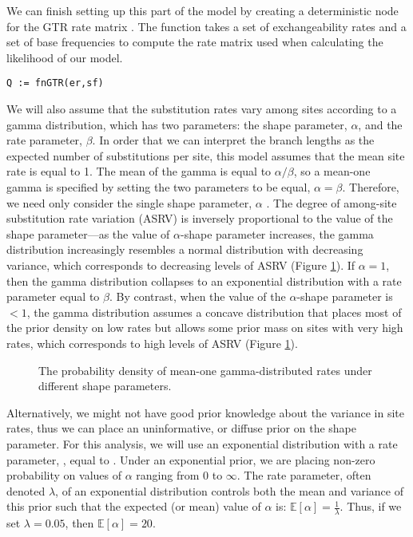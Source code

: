 We can finish setting up this part of the model by creating a deterministic node for the GTR rate matrix . 
The  function takes a set of exchangeability rates and a set of base frequencies to compute the rate matrix used when calculating the likelihood of our model.
{\tt \begin{snugshade*}
\begin{lstlisting}
Q := fnGTR(er,sf)
\end{lstlisting}
\end{snugshade*}}


We will also assume that the substitution rates vary among sites according to a gamma distribution, which has two parameters: the shape parameter, $\alpha$, and the rate parameter, $\beta$. 
In order that we can interpret the branch lengths as the expected number of substitutions per site, this model assumes that the mean site rate is equal to 1.
The mean of the gamma is equal to $\alpha/\beta$, so a mean-one gamma is specified by setting the two parameters to be equal, $\alpha=\beta$.
Therefore, we need only consider the single shape parameter, $\alpha$ \citep{yang94a}. 
The degree of among-site substitution rate variation (ASRV) is inversely proportional to the value of the shape parameter---as the value of $\alpha$-shape parameter increases, the gamma distribution increasingly resembles a normal distribution with decreasing variance, which corresponds to decreasing levels of ASRV (Figure \ref{asrhGammaFig}).
If $\alpha = 1$, then the gamma distribution collapses to an exponential distribution with a rate parameter equal to $\beta$.
By contrast, when the value of the $\alpha$-shape parameter is $< 1$, the gamma distribution assumes a concave distribution that places most of the prior density on low rates but allows some prior mass on sites with very high rates, which corresponds to high levels of ASRV (Figure \ref{asrhGammaFig}).

\begin{figure}[h]
\centering
{}
\caption{\small The probability density of mean-one gamma-distributed rates under different shape parameters.}
\label{asrhGammaFig}
\end{figure}


Alternatively, we might not have good prior knowledge about the variance in site rates, thus we can place an uninformative, or diffuse prior on the shape parameter.
For this analysis, we will use an exponential distribution with a rate parameter, , equal to .
Under an exponential prior, we are placing non-zero probability on values of $\alpha$ ranging from 0 to $\infty$. 
The rate parameter, often denoted $\lambda$, of an exponential distribution controls both the mean and variance of this prior such that the expected (or mean) value of $\alpha$ is:
$\mathbb{E}[\alpha] = \frac{1}{\lambda}.$
Thus, if we set $\lambda=0.05$, then $\mathbb{E}[\alpha] = 20$.

